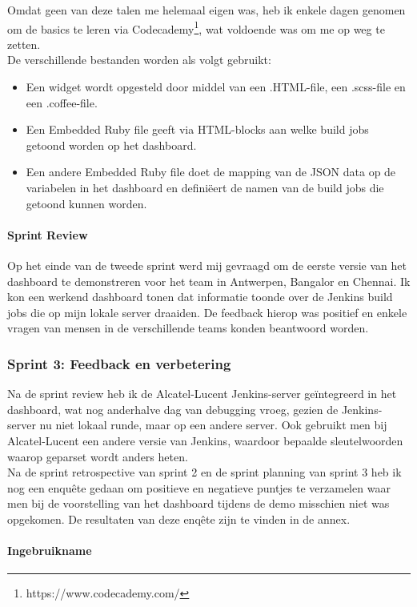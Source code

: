 \documentclass[10pt,a4paper]{article}
\begin{document}
Omdat geen van deze talen me helemaal eigen was, heb ik enkele dagen genomen om de basics te leren via Codecademy\footnote{https://www.codecademy.com/}, wat voldoende was om me op weg te zetten.\\
De verschillende bestanden worden als volgt gebruikt:
\begin{itemize}
\item Een widget wordt opgesteld door middel van een .HTML-file, een .scss-file en een .coffee-file.
\item Een Embedded Ruby file geeft via HTML-blocks aan welke build jobs getoond worden op het dashboard.
\item Een andere Embedded Ruby file doet de mapping van de JSON data op de variabelen in het dashboard en defini\"eert de namen van de build jobs die getoond kunnen worden.
\end{itemize}
\paragraph{Sprint Review} Op het einde van de tweede sprint werd mij gevraagd om de eerste versie van het dashboard te demonstreren voor het team in Antwerpen, Bangalor en Chennai. Ik kon een werkend dashboard tonen dat informatie toonde over de Jenkins build jobs die op mijn lokale server draaiden. De feedback hierop was positief en enkele vragen van mensen in de verschillende teams konden beantwoord worden. 
\subsubsection{Sprint 3: Feedback en verbetering}
\label{sprint3}
Na de sprint review heb ik de Alcatel-Lucent Jenkins-server ge\"integreerd in het dashboard, wat nog anderhalve dag van debugging vroeg, gezien de Jenkins-server nu niet lokaal runde, maar op een andere server. Ook gebruikt men bij Alcatel-Lucent een andere versie van Jenkins, waardoor bepaalde sleutelwoorden waarop geparset wordt anders heten.\\
Na de sprint retrospective van sprint 2 en de sprint planning van sprint 3 heb ik nog een enqu\^ete gedaan om positieve en negatieve puntjes te verzamelen waar men bij de voorstelling van het dashboard tijdens de demo misschien niet was opgekomen. De resultaten van deze enq\^ete zijn te vinden in de annex.
\paragraph{Ingebruikname} 
\end{document}
